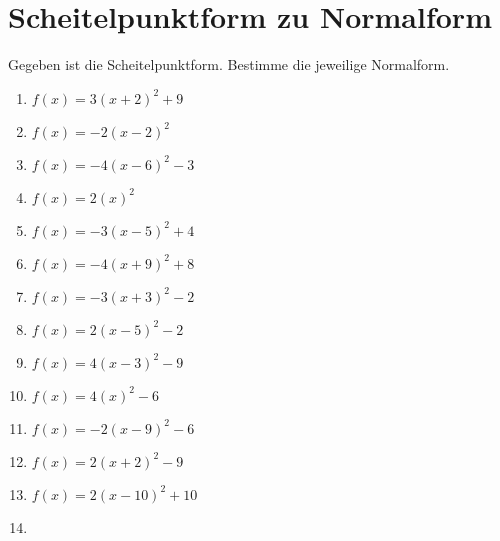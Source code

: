 \documentclass{article}%
\begin{document}
\section{Scheitelpunktform zu Normalform}%
\label{sec:ScheitelpunktformzuNormalform}%
Gegeben ist die Scheitelpunktform. Bestimme die jeweilige Normalform.%
\begin{enumerate}[label=\alph*)]%
\item%
\newline\vspace{0.5cm} $f(x)=3(x+2)^2 +9$%
\item%
\newline\vspace{0.5cm} $f(x)=-2(x-2)^2$%
\item%
\newline\vspace{0.5cm} $f(x)=-4(x-6)^2 -3$%
\item%
\newline\vspace{0.5cm} $f(x)=2(x)^2$%
\item%
\newline\vspace{0.5cm} $f(x)=-3(x-5)^2 +4$%
\item%
\newline\vspace{0.5cm} $f(x)=-4(x+9)^2 +8$%
\item%
\newline\vspace{0.5cm} $f(x)=-3(x+3)^2 -2$%
\item%
\newline\vspace{0.5cm} $f(x)=2(x-5)^2 -2$%
\item%
\newline\vspace{0.5cm} $f(x)=4(x-3)^2 -9$%
\item%
\newline\vspace{0.5cm} $f(x)=4(x)^2 -6$%
\item%
\newline\vspace{0.5cm} $f(x)=-2(x-9)^2 -6$%
\item%
\newline\vspace{0.5cm} $f(x)=2(x+2)^2 -9$%
\item%
\newline\vspace{0.5cm} $f(x)=2(x-10)^2 +10$%
\item%

\end{enumerate}
\end{document}
